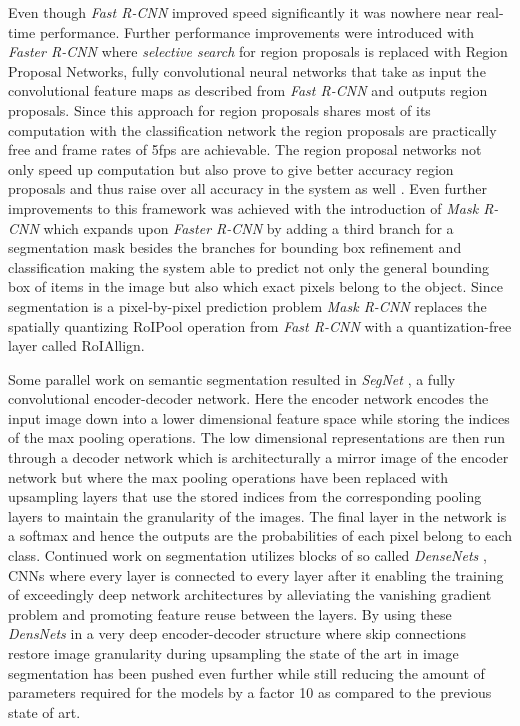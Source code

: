 \documentclass{kththesis}
\newcommand{\bibentry}[1]{\parencite{#1}}
\begin{document}
Even though
\emph{Fast R-CNN} improved speed significantly it was nowhere near real-time
performance. Further performance improvements were introduced with \emph{Faster
  R-CNN} \bibentry{ren2015faster} where \emph{selective search} for region
proposals is replaced with Region Proposal Networks, fully convolutional neural
networks that take as input the convolutional feature maps as described from
\emph{Fast R-CNN} and outputs region proposals. Since this approach for region
proposals shares most of its computation with the classification network the
region proposals are practically free and frame rates of 5fps are achievable.
The region proposal networks not only speed up computation but also prove to
give better accuracy region proposals and thus raise over all accuracy in the
system as well \bibentry{ren2015faster}. Even further improvements to this
framework was achieved with the introduction of \emph{Mask R-CNN}
\bibentry{he2017mask} which expands upon \emph{Faster R-CNN} by adding a third
branch for a segmentation mask besides the branches for bounding box refinement
and classification making the system able to predict not only the general
bounding box of items in the image but also which exact pixels belong to the
object. Since segmentation is a pixel-by-pixel prediction problem \emph{Mask
  R-CNN} replaces the spatially quantizing RoIPool operation from \emph{Fast
  R-CNN} with a quantization-free layer called RoIAllign. 

Some parallel work on semantic segmentation resulted in \emph{SegNet}
\bibentry{badrinarayanan2015segnet}, a fully convolutional encoder-decoder
network. Here the encoder network encodes the input image down into a lower
dimensional feature space while storing the indices of the max pooling
operations. The low dimensional representations are then run through a decoder
network which is architecturally a mirror image of the encoder network but where
the max pooling operations have been replaced with upsampling layers that use
the stored indices from the corresponding pooling layers to maintain the
granularity of the images. The final layer in the network is a softmax and hence
the outputs are the probabilities of each pixel belong to each class.
Continued work on segmentation utilizes blocks of so called \emph{DenseNets}
\bibentry{huang2017densely}, CNNs where every layer is connected to every layer
after it enabling the training of exceedingly deep network architectures by
alleviating the vanishing gradient problem and promoting feature reuse between
the layers. By using these \emph{DensNets} in a very deep encoder-decoder
structure where skip connections restore image granularity during upsampling the
state of the art in image segmentation has been pushed even further
\bibentry{jegou2017one} while still reducing the amount of parameters required
for the models by a factor 10 as compared to the previous state of art. 
\end{document}
